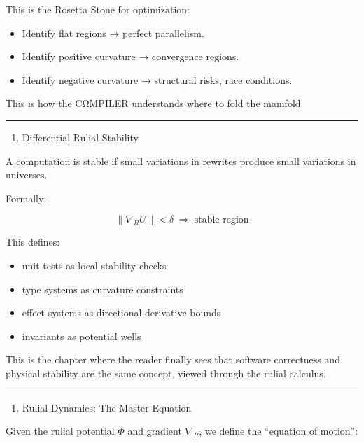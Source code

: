 This is the Rosetta Stone for optimization:
\begin{itemize}[nosep]
  \item Identify flat regions → perfect parallelism.
  \item Identify positive curvature → convergence regions.
  \item Identify negative curvature → structural risks, race conditions.
\end{itemize}

This is how the CΩMPILER understands where to fold the manifold.

\begin{center}\rule{0.5\linewidth}{0.5pt}\end{center}

\begin{enumerate}
\def\labelenumi{\arabic{enumi}.}
\setcounter{enumi}{6}
\tightlist
\item
  Differential Rulial Stability
\end{enumerate}

A computation is stable if small variations in rewrites produce small
variations in universes.

Formally:

\[
\lVert \nabla_R U \rVert < \delta \;\Rightarrow\; \text{stable region}
\]

This defines:
\begin{itemize}[nosep]
  \item unit tests as local stability checks
  \item type systems as curvature constraints
  \item effect systems as directional derivative bounds
  \item invariants as potential wells
\end{itemize}

This is the chapter where the reader finally sees that software
correctness and physical stability are the same concept, viewed through
the rulial calculus.

\begin{center}\rule{0.5\linewidth}{0.5pt}\end{center}

\begin{enumerate}
\def\labelenumi{\arabic{enumi}.}
\setcounter{enumi}{7}
\tightlist
\item
  Rulial Dynamics: The Master Equation
\end{enumerate}

Given the rulial potential $\Phi$ and gradient $\nabla_R$, we define the
``equation of motion'':

